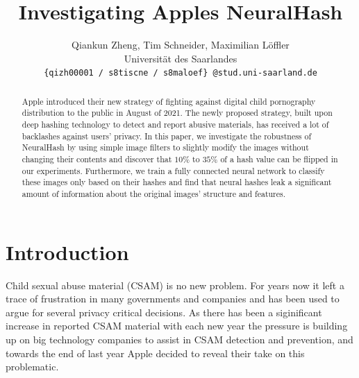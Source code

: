 \documentclass[10pt,twocolumn,letterpaper]{article}
\newcommand{\rref}[1]{\hyperref[ref:#1]{\text{[#1]}}}
\begin{document}
\title{Investigating Apples NeuralHash}

\author{Qiankun Zheng, Tim Schneider, Maximilian Löffler\\
Universität des Saarlandes\\
{\tt\small \{qizh00001 / s8tiscne / s8maloef\} @stud.uni-saarland.de}

}
\maketitle

\begin{abstract}
Apple introduced their new strategy of fighting against digital child pornography distribution to the public in August of 2021. The newly proposed strategy, built upon deep hashing technology to detect and report abusive materials, has received a lot of backlashes against users' privacy. In this paper, we investigate the robustness of NeuralHash by using simple image filters to slightly modify the images without changing their contents and discover that $10\%$ to $35\%$ of a hash value can be flipped in our experiments. Furthermore, we train a fully connected neural network to classify these images only based on their hashes and find that neural hashes leak a significant amount of information about the original images' structure and features.
\end{abstract}


\section{Introduction}
\label{sec:intro}
Child sexual abuse material (CSAM) is no new problem. For years now it left a trace of frustration in many governments and companies and has been used to argue for several privacy critical decisions. As there has been a siginificant increase in reported CSAM material with each new year \rref{4} the pressure is building up on big technology companies to assist in CSAM detection and prevention, and towards the end of last year Apple decided to reveal their take on this problematic.  
\end{document}
